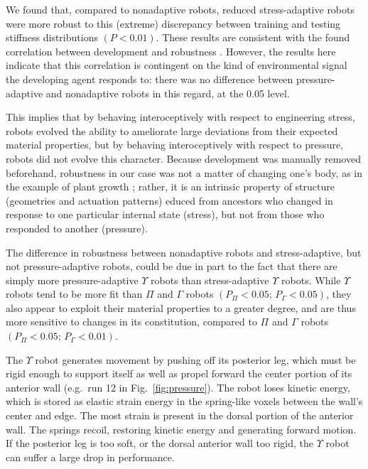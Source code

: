 We found that, compared to nonadaptive robots, reduced stress-adaptive robots 
were 
more robust to this (extreme) discrepancy between training and testing stiffness distributions $(P < 0.01)$.
These results are consistent with the 
found correlation between development and robustness
\cite{miller2004evolving,bongard2011morphological,kriegman2017morphological}.
However, the results here indicate that this correlation is contingent on the kind of environmental
signal the developing agent responds to: there was no difference between pressure-adaptive and nonadaptive robots in this regard, at the 0.05 level.

This implies that by behaving interoceptively with respect to engineering stress, robots evolved the ability to ameliorate large deviations from their expected material properties, but by behaving interoceptively with respect to pressure, robots did not evolve this character.
Because development was manually removed beforehand, robustness in our case was not a matter of changing one's body, as in the example of plant growth \citep{sultan2000phenotypic}; rather, it is an intrinsic property of structure (geometries and actuation patterns) educed from ancestors who changed in response to one particular internal state (stress), but not from those who responded to another (pressure).


The difference in robustness between nonadaptive robots and stress-adaptive, but not pressure-adaptive robots, could be due in part to the fact that there are simply more pressure-adaptive $\Upsilon$ robots than stress-adaptive $\Upsilon$ robots.
While $\Upsilon$ robots tend to be more fit than $\Pi$ and $\Gamma$ robots $(P_{\Pi}<0.05;\, P_{\Gamma}<0.05)$,
they also appear to exploit their material properties to a greater degree, and are thus more sensitive to changes in its constitution, compared to $\Pi$ and $\Gamma$ robots $(P_{\Pi}<0.05;\, P_{\Gamma}<0.01)$.

The $\Upsilon$ robot generates movement by pushing off its posterior leg,
which must be rigid enough to support itself as well as 
propel forward the center portion of its anterior wall 
(e.g.~run 12 in Fig.~\ref{fig:pressure}).
The robot loses kinetic energy, which is stored as elastic strain energy in the spring-like voxels between the wall's center and edge.
The most strain is present in the dorsal portion of the anterior wall.
The springs recoil, restoring kinetic energy and generating forward motion.
If the posterior leg is too soft, or the dorsal anterior wall too rigid, the $\Upsilon$ robot can suffer a large drop in performance.

